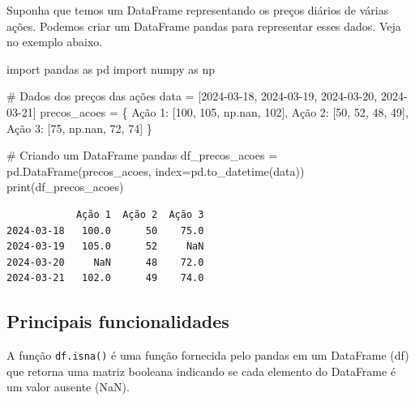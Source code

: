 \documentclass[
  portuguese,
  letterpaper,
  DIV=11,
  numbers=noendperiod]{scrreprt}
\newenvironment{Shaded}{\begin{snugshade}}{\end{snugshade}}
\newcommand{\BuiltInTok}[1]{\textcolor[rgb]{0.00,0.23,0.31}{#1}}
\newcommand{\CommentTok}[1]{\textcolor[rgb]{0.37,0.37,0.37}{#1}}
\newcommand{\DecValTok}[1]{\textcolor[rgb]{0.68,0.00,0.00}{#1}}
\newcommand{\ImportTok}[1]{\textcolor[rgb]{0.00,0.46,0.62}{#1}}
\newcommand{\NormalTok}[1]{\textcolor[rgb]{0.00,0.23,0.31}{#1}}
\newcommand{\OperatorTok}[1]{\textcolor[rgb]{0.37,0.37,0.37}{#1}}
\newcommand{\StringTok}[1]{\textcolor[rgb]{0.13,0.47,0.30}{#1}}
\theoremstyle{definition}
\theoremstyle{remark}
\begin{document}
Suponha que temos um DataFrame representando os preços diários de várias
ações. Podemos criar um DataFrame pandas para representar esses dados.
Veja no exemplo abaixo.

\begin{Shaded}
\begin{Highlighting}[]
\ImportTok{import}\NormalTok{ pandas }\ImportTok{as}\NormalTok{ pd}
\ImportTok{import}\NormalTok{ numpy }\ImportTok{as}\NormalTok{ np}

\CommentTok{\# Dados dos preços das ações}
\NormalTok{data }\OperatorTok{=}\NormalTok{ [}\StringTok{\textquotesingle{}2024{-}03{-}18\textquotesingle{}}\NormalTok{, }\StringTok{\textquotesingle{}2024{-}03{-}19\textquotesingle{}}\NormalTok{, }\StringTok{\textquotesingle{}2024{-}03{-}20\textquotesingle{}}\NormalTok{, }\StringTok{\textquotesingle{}2024{-}03{-}21\textquotesingle{}}\NormalTok{]}
\NormalTok{precos\_acoes }\OperatorTok{=}\NormalTok{ \{}
    \StringTok{\textquotesingle{}Ação 1\textquotesingle{}}\NormalTok{: [}\DecValTok{100}\NormalTok{, }\DecValTok{105}\NormalTok{, np.nan, }\DecValTok{102}\NormalTok{],}
    \StringTok{\textquotesingle{}Ação 2\textquotesingle{}}\NormalTok{: [}\DecValTok{50}\NormalTok{, }\DecValTok{52}\NormalTok{, }\DecValTok{48}\NormalTok{, }\DecValTok{49}\NormalTok{],}
    \StringTok{\textquotesingle{}Ação 3\textquotesingle{}}\NormalTok{: [}\DecValTok{75}\NormalTok{, np.nan, }\DecValTok{72}\NormalTok{, }\DecValTok{74}\NormalTok{]}
\NormalTok{\}}

\CommentTok{\# Criando um DataFrame pandas}
\NormalTok{df\_precos\_acoes }\OperatorTok{=}\NormalTok{ pd.DataFrame(precos\_acoes, index}\OperatorTok{=}\NormalTok{pd.to\_datetime(data))}
\BuiltInTok{print}\NormalTok{(df\_precos\_acoes)}
\end{Highlighting}
\end{Shaded}

\begin{verbatim}
            Ação 1  Ação 2  Ação 3
2024-03-18   100.0      50    75.0
2024-03-19   105.0      52     NaN
2024-03-20     NaN      48    72.0
2024-03-21   102.0      49    74.0
\end{verbatim}

\subsection{Principais
funcionalidades}\label{principais-funcionalidades}

A função \texttt{df.isna()} é uma função fornecida pelo pandas em um
DataFrame (df) que retorna uma matriz booleana indicando se cada
elemento do DataFrame é um valor ausente (NaN).
\end{document}
